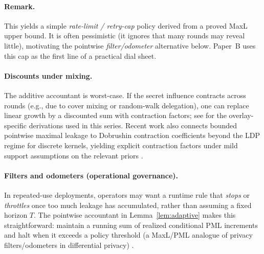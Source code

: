 \documentclass[11pt]{article}
\begin{document}
\paragraph{Remark.}
This yields a simple \emph{rate-limit / retry-cap} policy derived from a proved MaxL upper bound.
It is often pessimistic (it ignores that many rounds may reveal little), motivating the pointwise \emph{filter/odometer} alternative below.
Paper~B uses this cap as the first line of a practical dial sheet.

\paragraph{Discounts under mixing.}
The additive accountant is worst-case.
If the secret influence contracts across rounds (e.g., due to cover mixing or random-walk delegation), one can replace linear growth by a discounted sum with contraction factors; see \cite{series:spectral} for the overlay-specific derivations used in this series. Recent work also connects bounded pointwise maximal leakage to Dobrushin contraction coefficients beyond the LDP regime for discrete kernels, yielding explicit contraction factors under mild support assumptions on the relevant priors \cite{grosse2026dobrushin}.

\paragraph{Filters and odometers (operational governance).}
In repeated-use deployments, operators may want a runtime rule that \emph{stops} or \emph{throttles} once too much leakage has accumulated, rather than assuming a fixed horizon $T$.
The pointwise accountant in Lemma~\ref{lem:adaptive} makes this straightforward: maintain a running sum of realized conditional PML increments and halt when it exceeds a policy threshold (a MaxL/PML analogue of privacy filters/odometers in differential privacy) \cite{rogers2016privacyodometers}.
\end{document}
